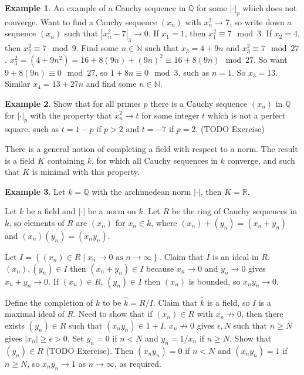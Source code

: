 \documentclass{article}
\newcommand{\N}{\mathbb{N}}
\newcommand{\Q}{\mathbb{Q}}
\newcommand{\R}{\mathbb{R}}
\newcommand{\rb}[1]{\left( #1 \right)}
\newcommand{\cb}[1]{\left\{ #1 \right\}}
\newcommand{\abs}[1]{\left\lvert #1 \right\rvert}
\theoremstyle{definition}\newtheorem{definition}{Definition}[section]
\theoremstyle{definition}\newtheorem{remark}[definition]{Remark}
\theoremstyle{definition}\newtheorem*{example}{Example}
\theoremstyle{definition}\newtheorem*{note}{Note}
\begin{document}
\begin{example}
An example of a Cauchy sequence in $ \Q $ for some $ \abs{\cdot}_p $ which does not converge. Want to find a Cauchy sequence $ \rb{x_n} $ with $ x_n^2 \to 7 $, so write down a sequence $ \rb{x_n} $ such that $ \abs{x_n^2 - 7}_3 \to 0 $. If $ x_1 = 1 $, then $ x_1^2 \equiv 7 \mod 3 $. If $ x_2 = 4 $, then $ x_2^2 \equiv 7 \mod 9 $. Find some $ n \in \N $ such that $ x_3 = 4 + 9n $ and $ x_3^2 \equiv 7 \mod 27 $. $ x_3^2 = \rb{4 + 9n^2} = 16 + 8\rb{9n} + \rb{9n}^2 \equiv 16 + 8\rb{9n} \mod 27 $. So want $ 9 + 8\rb{9n} \equiv 0 \mod 27 $, so $ 1 + 8n \equiv 0 \mod 3 $, such as $ n = 1 $. So $ x_3 = 13 $. Similar $ x_4 = 13 + 27n $ and find some $ n \in \N $.
\end{example}

\begin{example}
Show that for all primes $ p $ there is a Cauchy sequence $ \rb{x_n} $ in $ \Q $ for $ \abs{\cdot}_p $ with the property that $ x_n^2 \to t $ for some integer $ t $ which is not a perfect square, such as $ t = 1 - p $ if $ p > 2 $ and $ t = -7 $ if $ p = 2 $. (TODO Exercise)
\end{example}

There is a general notion of completing a field with respect to a norm. The result is a field $ K $ containing $ k $, for which all Cauchy sequences in $ k $ converge, and such that $ K $ is minimal with this property.

\begin{example}
Let $ k = \Q $ with the archimedean norm $ \abs{\cdot} $, then $ K = \R $.
\end{example}


Let $ k $ be a field and $ \abs{\cdot} $ be a norm on $ k $. Let $ R $ be the ring of Cauchy sequences in $ k $, so elements of $ R $ are $ \rb{x_n} $ for $ x_n \in k $, where $ \rb{x_n} + \rb{y_n} = \rb{x_n + y_n} $ and $ \rb{x_n}\rb{y_n} = \rb{x_ny_n} $.

Let $ I = \cb{\rb{x_n} \in R \mid x_n \to 0 \text{ as } n \to \infty} $. Claim that $ I $ is an ideal in $ R $. $ \rb{x_n}, \rb{y_n} \in I $ then $ \rb{x_n + y_n} \in I $ because $ x_n \to 0 $ and $ y_n \to 0 $ gives $ x_n + y_n \to 0 $. If $ \rb{x_n} \in R $, $ \rb{y_n} \in I $ then $ \rb{x_n} $ is bounded, so $ x_ny_n \to 0 $.

Define the completion of $ k $ to be $ \hat{k} = R / I $. Claim that $ \hat{k} $ is a field, so $ I $ is a maximal ideal of $ R $. Need to show that if $ \rb{x_n} \in R $ with $ x_n \not\to 0 $, then there exists $ \rb{y_n} \in R $ such that $ \rb{x_ny_n} \in 1 + I $. $ x_n \not\to 0 $ gives $ \epsilon, N $ such that $ n \ge N $ gives $ \abs{x_n} \ge \epsilon > 0 $. Set $ y_n = 0 $ if $ n < N $ and $ y_n = 1 / x_n $ if $ n \ge N $. Show that $ \rb{y_n} \in R $ (TODO Exercise). Then $ \rb{x_ny_n} = 0 $ if $ n < N $ and $ \rb{x_ny_n} = 1 $ if $ n \ge N $, so $ x_ny_n \to 1 $ as $ n \to \infty $, as required.
\end{document}
